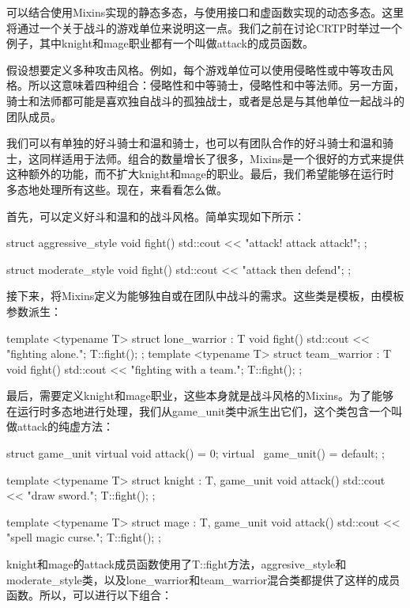 可以结合使用Mixins实现的静态多态，与使用接口和虚函数实现的动态多态。这里将通过一个关于战斗的游戏单位来说明这一点。我们之前在讨论CRTP时举过一个例子，其中knight和mage职业都有一个叫做attack的成员函数。

假设想要定义多种攻击风格。例如，每个游戏单位可以使用侵略性或中等攻击风格。所以这意味着四种组合：侵略性和中等骑士，侵略性和中等法师。另一方面，骑士和法师都可能是喜欢独自战斗的孤独战士，或者是总是与其他单位一起战斗的团队成员。

我们可以有单独的好斗骑士和温和骑士，也可以有团队合作的好斗骑士和温和骑士，这同样适用于法师。组合的数量增长了很多，Mixins是一个很好的方式来提供这种额外的功能，而不扩大knight和mage的职业。最后，我们希望能够在运行时多态地处理所有这些。现在，来看看怎么做。

首先，可以定义好斗和温和的战斗风格。简单实现如下所示：

\begin{cppcode}
struct aggressive_style
{
	void fight()
	{
		std::cout << "attack! attack attack!\n";
	}
};

struct moderate_style
{
	void fight()
	{
		std::cout << "attack then defend\n";
	}
};
\end{cppcode}

接下来，将Mixins定义为能够独自或在团队中战斗的需求。这些类是模板，由模板参数派生：

\begin{cppcode}
template <typename T>
struct lone_warrior : T
{
	void fight()
	{
		std::cout << "fighting alone.";
		T::fight();
	}
};
template <typename T>
struct team_warrior : T
{
	void fight()
	{
		std::cout << "fighting with a team.";
		T::fight();
	}
};
\end{cppcode}

最后，需要定义knight和mage职业，这些本身就是战斗风格的Mixins。为了能够在运行时多态地进行处理，我们从game_unit类中派生出它们，这个类包含一个叫做attack的纯虚方法：

\begin{cppcode}
struct game_unit
{
	virtual void attack() = 0;
	virtual ~game_unit() = default;
};

template <typename T>
struct knight : T, game_unit
{
	void attack()
	{
		std::cout << "draw sword.";
		T::fight();
	}
};

template <typename T>
struct mage : T, game_unit
{
	void attack()
	{
		std::cout << "spell magic curse.";
		T::fight();
	}
};
\end{cppcode}

knight和mage的attack成员函数使用了T::fight方法，aggresive_style和moderate_style类，以及lone_warrior和team_warrior混合类都提供了这样的成员函数。所以，可以进行以下组合：

